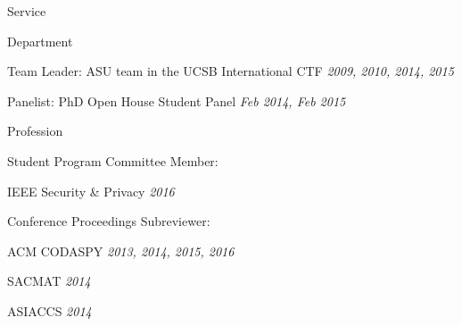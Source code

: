\begin{rSection}{Service}

  \begin{rSubsection}{Department}

    \item Team Leader: ASU team in the UCSB International CTF \hfill \emph{2009, 2010, 2014, 2015}

    \item Panelist: PhD Open House Student Panel \hfill \emph{Feb 2014, Feb 2015}

  \end{rSubsection}

  \begin{rSubsection}{Profession}

    \item Student Program Committee Member:
      \begin{rBulletList}

        \item IEEE Security \& Privacy \hfill \emph{2016}

      \end{rBulletList}

    \item Conference Proceedings Subreviewer:
      \begin{rBulletList}

        \item ACM CODASPY \hfill \emph{2013, 2014, 2015, 2016}

        \item SACMAT \hfill \emph{2014}

        \item ASIACCS \hfill \emph{2014}

      \end{rBulletList}

  \end{rSubsection}

\end{rSection}
